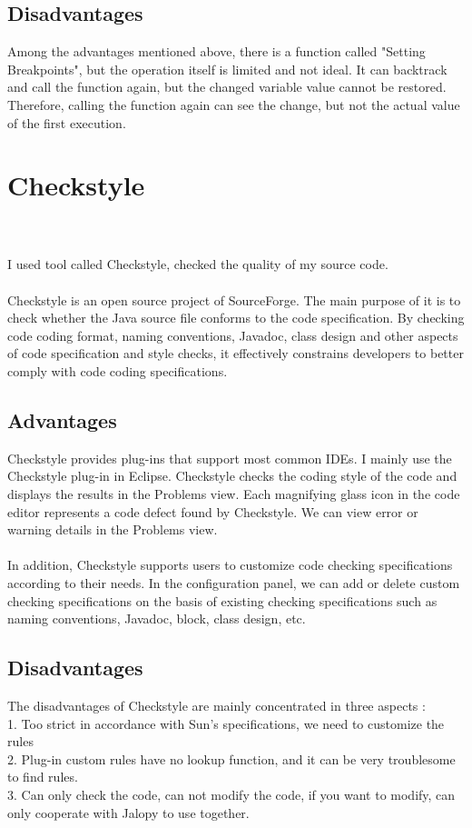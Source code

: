 \documentclass[12pt,letterpaper]{article}
\begin{document}
\subsection{Disadvantages}
Among the advantages mentioned above, there is a function called "Setting Breakpoints", but the operation itself is limited and not ideal. It can backtrack and call the function again, but the changed variable value cannot be restored. Therefore, calling the function again can see the change, but not the actual value of the first execution.

\section{Checkstyle}\\
\\
I used tool called Checkstyle, checked the quality of my source code.\\
\\
Checkstyle is an open source project of SourceForge. The main purpose of it is to check whether the Java source file conforms to the code specification. By checking code coding format, naming conventions, Javadoc, class design and other aspects of code specification and style checks, it effectively constrains developers to better comply with code coding specifications.
\subsection{Advantages}
Checkstyle provides plug-ins that support most common IDEs. I mainly use the Checkstyle plug-in in Eclipse. Checkstyle checks the coding style of the code and displays the results in the Problems view. Each magnifying glass icon in the code editor represents a code defect found by Checkstyle. We can view error or warning details in the Problems view.\\
\\
In addition, Checkstyle supports users to customize code checking specifications according to their needs. In the configuration panel, we can add or delete custom checking specifications on the basis of existing checking specifications such as naming conventions, Javadoc, block, class design, etc.
\subsection{Disadvantages}
The disadvantages of Checkstyle are mainly concentrated in three aspects :\\
1. Too strict in accordance with Sun's specifications, we need to customize the rules\\
2. Plug-in custom rules have no lookup function, and it can be very troublesome to find rules.\\
3. Can only check the code, can not modify the code, if you want to modify, can only cooperate with Jalopy to use together.\\
\\
\\
\\
\\
\end{document}

